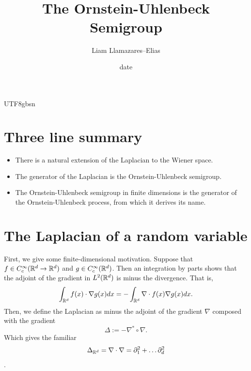\documentclass[12pt]{article}
\begin{document}
\begin{CJK*}{UTF8}{gbsn}
	\title{The Ornstein-Uhlenbeck Semigroup}
	\author{Liam Llamazares--Elias}
	\date{date}
	\maketitle
	\section{ Three line summary}
	\begin{itemize}
		\item There is a natural extension of the Laplacian to the Wiener space.
		\item The generator of the Laplacian is the Ornstein-Uhlenbeck semigroup.
		\item The Ornstein-Uhlenbeck semigroup in finite dimensions is the generator of the Ornstein-Uhlenbeck process, from which it derives its name.	\end{itemize}
	\section{The Laplacian of a random variable}
	First, we give some finite-dimensional motivation. Suppose that $f\in C_c^\infty({\mathbb R}^d\to{\mathbb R}^d)$ and $g\in C_c^\infty({\mathbb R}^d)$. Then an integration by parts shows that the adjoint of the gradient
	in $L^2({\mathbb R}^d)$ is minus the divergence. That is,
	\begin{equation*}
		\int_{{\mathbb R}^d}f(x) \cdot \nabla g(x) dx=-\int_{{\mathbb R}^d}\nabla\cdot  f(x) \nabla g(x) dx.
	\end{equation*}
	Then, we define the Laplacian as minus the adjoint of the gradient $\nabla$ composed with the gradient
	\begin{equation*}
		\Delta := -\nabla^*\circ \nabla .
	\end{equation*}
	Which gives the familiar $$\Delta_{{\mathbb R}^d} =\nabla\cdot \nabla=\partial_1^2+\ldots\partial _d^2$$.


\end{CJK*}
\end{document}
